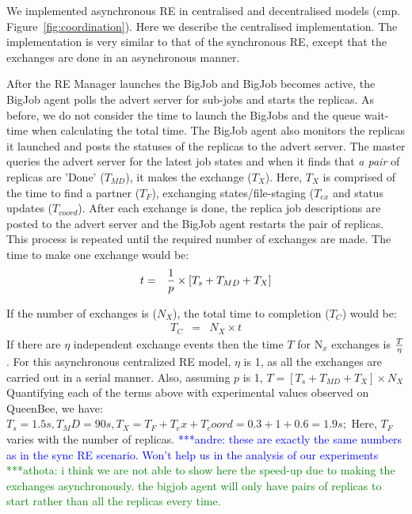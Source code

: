 \documentclass{rspublic}
\newcommand{\alnote}[1]{ {\textcolor{blue} { ***andre: #1 }}}
\newcommand{\athotanote}[1]{ {\textcolor{green} { ***athota: #1 }}}
\newcommand{\alnote}[1]{}
\newcommand{\athotanote}[1]{}
\begin{document}

We implemented asynchronous RE in centralised and decentralised models 
(cmp. Figure~\ref{fig:coordination}). Here we describe the centralised 
implementation. The implementation is very similar to that of the 
synchronous RE, except that the exchanges are done in an asynchronous manner. 

After the RE Manager launches the BigJob and BigJob becomes active, the BigJob agent polls the advert server for sub-jobs and starts the replicas. As before, we do not consider the time to launch the BigJobs and the queue wait-time when calculating the total time.  The BigJob agent also monitors the 
replicas it launched and posts the statuses of the replicas to the advert 
server. The master queries the advert server for the latest job 
states and when it finds that \emph{a pair} of replicas are 'Done' ($T_{MD}$), it 
makes the exchange ($T_{X}$). Here, $T_{X}$ is comprised of the time to find a partner ($T_{F}$), exchanging states/file-staging ($T_{ex}$ and status updates ($T_{coord}$). 
After each exchange is done, the replica job descriptions 
are posted to the advert server and the BigJob agent restarts the pair of
replicas. This process is repeated until the required number of 
exchanges are made. The time to make one exchange would be:
\begin{eqnarray}
t &=&  {1 \over p} \times {[T_s+T_{MD} + T_{X}]} 
\label{eq:cent}
\end{eqnarray}

If the number of exchanges is ($N_{X}$), the total time to completion ($T_{C}$) would be:
\begin{eqnarray}
T_{C} &=& N_{X} \times t 
\label{eq:centr}
\end{eqnarray}
If there are $\eta$ independent exchange events then the time $T$ for
N$_x$ exchanges is $T \over \eta$. For this asynchronous centralized
RE model, $\eta$ is 1, as all the exchanges are carried out in a
serial manner. Also, assuming $p$ is 1, $T = [T_s+T_{MD} + T_{X} ]
\times N_{X}$ Quantifying each of the terms above with experimental
values observed on QueenBee, we have: $T_s = 1.5 s, T_MD=90 s,
T_X=T_F+T_ex+T_coord=0.3+1+0.6=1.9 s; $ Here, $T_F$ varies with the
number of replicas. \alnote{these are exactly the same numbers as in
  the sync RE scenario. Won't help us in the analysis of our
  experiments} \athotanote{i think we are not able to show here the speed-up due to making the exchanges asynchronously. the bigjob agent will only have pairs of replicas to start rather than all the replicas every time.}
\end{document}
